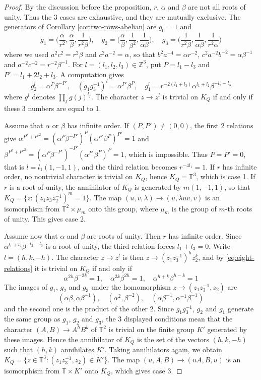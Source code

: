 \documentclass[11pt,reqno]{amsart}
\theoremstyle{definition}
\numberwithin{equation}{section}
\begin{document}
\begin{proof}
By the discussion before the proposition, $r$, $\alpha$ and $\beta$ are not all roots of unity. Thus the 3 cases are exhaustive, and they are mutually exclusive. The generators of Corollary \ref{cor:two-rows-abelian} are $g_0=1$ and
$$g_1=\Big(\frac\alpha{r^2},\frac\alpha\beta,\frac1{r^2\beta}\Big),\quad
g_2=\Big(\frac\alpha\beta,\frac1{\beta^2},\frac1{\alpha\beta}\Big),\quad
g_3=\Big(\frac1{r^2\beta},\frac1{\alpha\beta},\frac1{r^2\alpha}\Big)$$
where we used $a^2c^2=r^2\beta$ and $c^2a^{-2}=\alpha$, so that $b^2a^{-4}=\alpha r^{-2}$, $c^2a^{-2}b^{-2}=\alpha\beta^{-1}$ and $a^{-2}c^{-2}=r^{-2}\beta^{-1}$. For $l=(l_1,l_2,l_3)\in\mathbb Z^3$, put $P=l_1-l_3$ and $P'=l_1+2l_2+l_3$. A computation gives
\begin{equation}\label{eq:eight-relations}
g_2^l=\alpha^P\beta^{-P'},\quad
(g_1g_3^{-1})^l=\alpha^{P'}\beta^P,\quad
g_1^l=r^{-2(l_1+l_3)}\alpha^{l_1+l_2}\beta^{-l_2-l_3}
\end{equation}
where $g^l$ denotes $\prod_jg(j)^{l_j}$. The character $z\to z^l$ is trivial on $K_Q$ if and only if these 3 numbers are equal to 1.

Assume that $\alpha$ or $\beta$ has infinite order. If $(P,P')\neq(0,0)$, the first 2 relations give $\alpha^{P^2+P'^2}=(\alpha^P\beta^{-P'})^P(\alpha^{P'}\beta^P)^{P'}=1$ and $\beta^{P^2+P'^2}=(\alpha^P\beta^{-P'})^{-P'}(\alpha^{P'}\beta^P)^P=1$, which is impossible. Thus $P=P'=0$, that is $l=l_1(1,-1,1)$, and the third relation becomes $r^{-4l_1}=1$. If $r$ has infinite order, no nontrivial character is trivial on $K_Q$, hence $K_Q=\mathbb T^3$, which is case 1. If $r$ is a root of unity, the annihilator of $K_Q$ is generated by $m(1,-1,1)$, so that $K_Q=\{z:(z_1z_3z_2^{-1})^m=1\}$. The map $(u,v,\lambda)\to(u,\lambda uv,v)$ is an isomorphism from $\mathbb T^2\times\mu_m$ onto this group, where $\mu_m$ is the group of $m$-th roots of unity. This gives case 2.

Assume now that $\alpha$ and $\beta$ are roots of unity. Then $r$ has infinite order. Since $\alpha^{l_1+l_2}\beta^{-l_2-l_3}$ is a root of unity, the third relation forces $l_1+l_3=0$. Write $l=(h,k,-h)$. The character $z\to z^l$ is then $z\to(z_1z_3^{-1})^hz_2^k$, and by \eqref{eq:eight-relations} it is trivial on $K_Q$ if and only if
$$\alpha^{2h}\beta^{-2k}=1,\quad\alpha^{2k}\beta^{2h}=1,\quad\alpha^{h+k}\beta^{h-k}=1$$
The images of $g_1$, $g_2$ and $g_3$ under the homomorphism $z\to(z_1z_3^{-1},z_2)$ are
$$(\alpha\beta,\alpha\beta^{-1}),\quad(\alpha^2,\beta^{-2}),\quad(\alpha\beta^{-1},\alpha^{-1}\beta^{-1})$$
and the second one is the product of the other 2. Since $g_1g_3^{-1}$, $g_2$ and $g_1$ generate the same group as $g_1$, $g_2$ and $g_3$, the 3 displayed conditions mean that the character $(A,B)\to A^hB^k$ of $\mathbb T^2$ is trivial on the finite group $K'$ generated by these images. Hence the annihilator of $K_Q$ is the set of the vectors $(h,k,-h)$ such that $(h,k)$ annihilates $K'$. Taking annihilators again, we obtain $K_Q=\{z\in\mathbb T^3:(z_1z_3^{-1},z_2)\in K'\}$. The map $(u,A,B)\to(uA,B,u)$ is an isomorphism from $\mathbb T\times K'$ onto $K_Q$, which gives case 3.
\end{proof}
\end{document}
